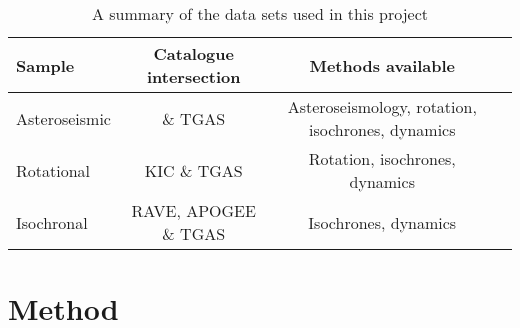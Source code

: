 \documentclass[useAMS, usenatbib, preprint, 12pt]{aastex}
\begin{document}
\begin{landscape}
\begin{table}
\begin{center}
\caption{A summary of the data sets used in this project}
\begin{tabular}{lccc}
    Sample & Catalogue intersection &  Methods available \\
    \hline
    Asteroseismic & \citet{Chaplin2014} \& TGAS & Asteroseismology, rotation,
    isochrones, dynamics \\
    Rotational & KIC \& TGAS & Rotation, isochrones, dynamics \\
    Isochronal & RAVE, APOGEE \& TGAS & Isochrones, dynamics \\
\end{tabular}
\end{center}
\end{table}
\label{tab:data}
\end{landscape}

\section{Method}
\label{sec:method}
\end{document}
